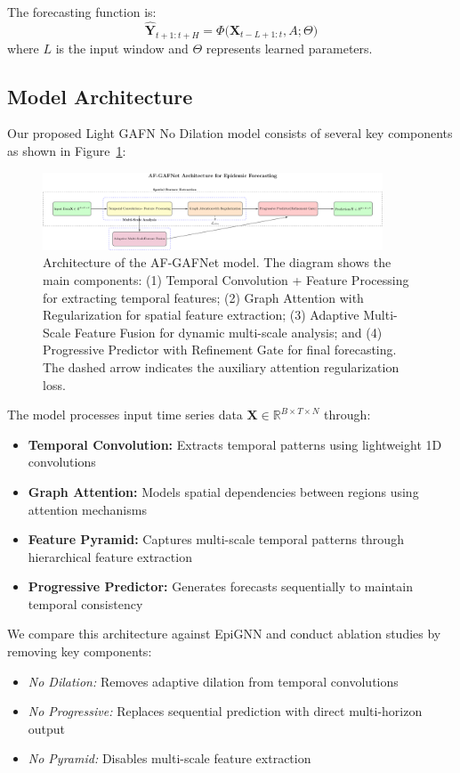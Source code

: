 \documentclass[lettersize, journal]{IEEEtran}
\begin{document}
The forecasting function is:
\[
\hat{\mathbf{Y}}_{t+1:t+H} = \Phi\bigl(\mathbf{X}_{t-L+1:t}, A; \Theta\bigr)
\]
where $L$ is the input window and $\Theta$ represents learned parameters.

\subsection{Model Architecture}
Our proposed Light GAFN No Dilation model consists of several key components as shown in Figure~\ref{fig:architecture}:

\begin{figure}[htb]
    \centering
    \includegraphics[width=0.9\textwidth]{../figures/architecture.pdf}
    \caption{Architecture of the AF-GAFNet model. The diagram shows the main components: (1) Temporal Convolution + Feature Processing for extracting temporal features; (2) Graph Attention with Regularization for spatial feature extraction; (3) Adaptive Multi-Scale Feature Fusion for dynamic multi-scale analysis; and (4) Progressive Predictor with Refinement Gate for final forecasting. The dashed arrow indicates the auxiliary attention regularization loss.}
    \label{fig:architecture}
\end{figure}
    

The model processes input time series data $\mathbf{X} \in \mathbb{R}^{B \times T \times N}$ through:
\begin{itemize}[leftmargin=*]
\item \textbf{Temporal Convolution:} Extracts temporal patterns using lightweight 1D convolutions
\item \textbf{Graph Attention:} Models spatial dependencies between regions using attention mechanisms
\item \textbf{Feature Pyramid:} Captures multi-scale temporal patterns through hierarchical feature extraction
\item \textbf{Progressive Predictor:} Generates forecasts sequentially to maintain temporal consistency
\end{itemize}

We compare this architecture against EpiGNN and conduct ablation studies by removing key components:
\begin{itemize}[leftmargin=*]
\item \emph{No Dilation:} Removes adaptive dilation from temporal convolutions
\item \emph{No Progressive:} Replaces sequential prediction with direct multi-horizon output
\item \emph{No Pyramid:} Disables multi-scale feature extraction
\end{itemize}
\end{document}
